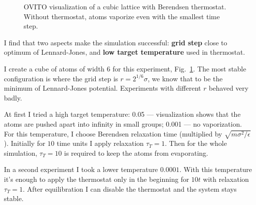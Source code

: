 \documentclass[12pt,a4paper]{article}
\begin{document}
\begin{figure}[htb]
\begin{minipage}{.3\textwidth}
	\end{minipage}\hfill
	\begin{minipage}{.3\textwidth}
		\centering
	\end{minipage}
	\caption{OVITO visualization of a cubic lattice with Berendsen thermostat. Without thermostat, atoms vaporize even with the smallest time step.}
	\label{fig:first_simulation_ovito}
\end{figure}

I find that two aspects make the simulation successful: {\bf grid step} close to optimum of Lennard-Jones, and {\bf low target temperature} used in thermostat.

I create a cube of atoms of width 6 for this experiment, Fig.~\ref{fig:first_simulation_ovito}. The most stable configuration is where the grid step is $r = 2^{1/6}\sigma$, we know that to be the minimum of Lennard-Jones potential. Experiments with different $r$ behaved very badly.

At first I tried a high target temperature: 0.05 --- visualization shows that the atoms are pushed apart into infinity in small groups; 0.001 --- no vaporization. For this temperature, I choose Berendsen relaxation time (multiplied by \( \sqrt{m\sigma^2 / \epsilon} \)). Initially for $10$ time units I apply relaxation \( \tau_T = 1 \). Then for the whole simulation, \( \tau_T = 10 \) is required to keep the atoms from evaporating. 

In a second experiment I took a lower temperature $0.0001$. With this temperature it's enough to apply the thermostat only in the beginning for $10t$ with relaxation $\tau_T = 1$. After equilibration I can disable the thermostat and the system stays stable.
\end{document}
